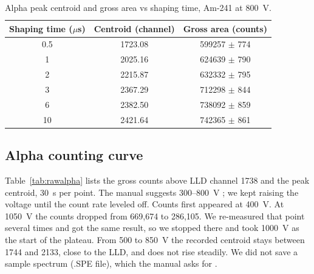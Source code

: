 \documentclass[12pt]{article}
\begin{document}
\begin{table}[!htbp]
\centering\small
\begin{tabular}{ccc}
\toprule
\textbf{Shaping time ($\mu$s)} & \textbf{Centroid (channel)} & \textbf{Gross area (counts)} \\
\midrule
0.5 & 1723.08 & 599257 $\pm$ 774 \\
1 & 2025.16 & 624639 $\pm$ 790 \\
2 & 2215.87 & 632332 $\pm$ 795 \\
3 & 2367.29 & 712298 $\pm$ 844 \\
6 & 2382.50 & 738092 $\pm$ 859 \\
10 & 2421.64 & 742365 $\pm$ 861 \\
\bottomrule
\end{tabular}
\caption{Alpha peak centroid and gross area vs shaping time, Am-241 at 800~V.}
\label{tab:rawshape}
\end{table}

\subsection{Alpha counting curve}

Table~\ref{tab:rawalpha} lists the gross counts above LLD channel 1738 and the peak centroid, 30~s per point. The manual suggests 300--800~V \cite{labmanual}; we kept raising the voltage until the count rate leveled off. Counts first appeared at 400~V. At 1050~V the counts dropped from 669,674 to 286,105. We re-measured that point several times and got the same result, so we stopped there and took 1000~V as the start of the plateau. From 500 to 850~V the recorded centroid stays between 1744 and 2133, close to the LLD, and does not rise steadily. We did not save a sample spectrum (.SPE file), which the manual asks for \cite{labmanual}.
\end{document}
